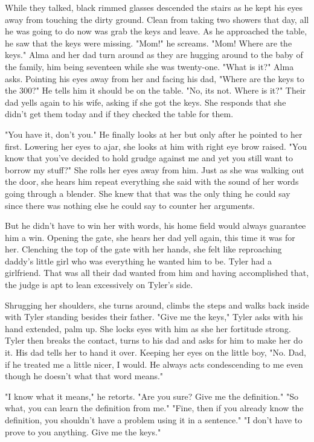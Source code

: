 \begin{Document}
        While they talked, black rimmed glasses descended the stairs as he kept his eyes away from touching the dirty ground. Clean from taking
    two showers that day, all he was going to do now was grab the keys and leave. As he approached the table, he saw that the keys were missing.
    "Mom!" he screams. "Mom! Where are the keys." Alma and her dad turn around as they are hugging around to the baby of the family, him being
    seventeen while she was twenty-one. "What is it?" Alma asks. Pointing his eyes away from her and facing his dad, "Where are the keys to the
    300?" He tells him it should be on the table. "No, its not. Where is it?" Their dad yells again to his wife, asking if she got the keys. She
    responds that she didn't get them today and if they checked the table for them.

        "You have it, don't you." He finally looks at her but only after he pointed to her first. Lowering her eyes to ajar, she looks at him with
    right eye brow raised. "You know that you've decided to hold grudge against me and yet you still want to borrow my stuff?" She rolls her eyes
    away from him. Just as she was walking out the door, she hears him repeat everything she said with the sound of her words going through a 
    blender. She knew that that was the only thing he could say since there was nothing else he could say to counter her arguments.

        But he didn't have to win her with words, his home field would always guarantee him a win. Opening the gate, she hears her dad yell again,
    this time it was for her. Clenching the top of the gate with her hands, she felt like reproaching daddy's little girl who was everything he
    wanted him to be. Tyler had a girlfriend. That was all their dad wanted from him and having accomplished that, the judge is apt to lean excessively
    on Tyler's side.

        Shrugging her shoulders, she turns around, climbs the steps and walks back inside with Tyler standing besides their father. "Give me the keys,"
    Tyler asks with his hand extended, palm up. She locks eyes with him as she her fortitude strong. Tyler then breaks the contact, turns to his dad
    and asks for him to make her do it. His dad tells her to hand it over. Keeping her eyes on the little boy, "No. Dad, if he treated me a little
    nicer, I would. He always acts condescending to me even though he doesn't what that word means."

        "I know what it means," he retorts. "Are you sure? Give me the definition." "So what, you can learn the definition from me." "Fine, then if
    you already know the definition, you shouldn't have a problem using it in a sentence." "I don't have to prove to you anything. Give me the keys."
\end{Document}

